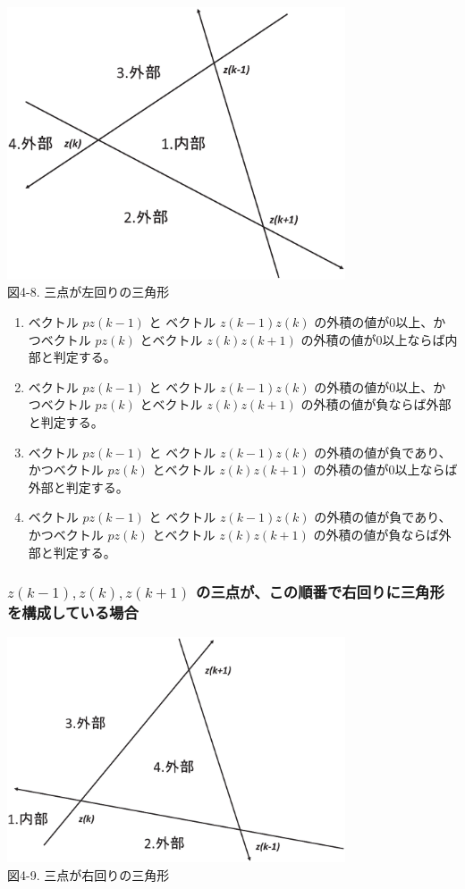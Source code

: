 \begin{center}
  \includegraphics[width=10cm]{hidarimawari_vec.eps} \\
 \vspace{-1mm}
  図4-8. 三点が左回りの三角形
\end{center}

\begin{enumerate}
 \item ベクトル $p z(k-1)$ と ベクトル $z(k-1) z(k)$ の外積の値が0以上、かつベクトル $p z(k)$ とベクトル $z(k) z(k+1)$ の外積の値が0以上ならば内部と判定する。
 \item ベクトル $p z(k-1)$ と ベクトル $z(k-1) z(k)$ の外積の値が0以上、かつベクトル $p z(k)$ とベクトル $z(k) z(k+1)$ の外積の値が負ならば外部と判定する。
 \item ベクトル $p z(k-1)$ と ベクトル $z(k-1) z(k)$ の外積の値が負であり、かつベクトル $p z(k)$ とベクトル $z(k) z(k+1)$ の外積の値が0以上ならば外部と判定する。
 \item ベクトル $p z(k-1)$ と ベクトル $z(k-1) z(k)$ の外積の値が負であり、かつベクトル $p z(k)$ とベクトル $z(k) z(k+1)$ の外積の値が負ならば外部と判定する。
\end{enumerate}

\subsubsection{$z(k-1),z(k),z(k+1)$ の三点が、この順番で右回りに三角形を構成している場合}

\begin{center}
  \includegraphics[width=10cm]{migimawari_vec.eps} \\
 \vspace{-1mm}
  図4-9. 三点が右回りの三角形
\end{center}

